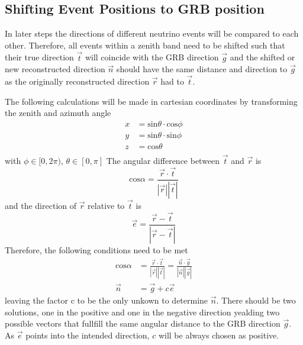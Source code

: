 \subsection{Shifting Event Positions to GRB position}
\label{sec:shift2source}
In later steps the directions of different neutrino events will be compared to
each other. Therefore, all events within a zenith band need to be shifted such
that their true
direction $\vec{t}$ will coincide with the GRB direction $\vec{g}$ and the
shifted or new reconstructed direction $\vec{n}$ should have the same distance
and direction
to $\vec{g}$ as the originally reconstructed direction $\vec{r}$ had to
$\vec{t}$.

The following calculations will be made in cartesian coordinates by
transforming the zenith and azimuth angle
\begin{equation}
 \begin{align}
  x &= \text{sin}\theta \cdot \text{cos} \phi \\
  y &= \text{sin}\theta \cdot \text{sin} \phi \\
  z &= \text{cos}\theta\\
 \end{align}
\end{equation}
with $\phi \in [0, 2 \pi)$, $\theta \in [0, \pi]$
The angular difference between $\vec{t}$ and $\vec{r}$ is
\begin{equation}
 \text{cos} \alpha = \frac{\vec{r} \cdot \vec{t}}{|\vec{r}| |\vec{t}|}
\end{equation}
and the direction of $\vec{r}$ relative to $\vec{t}$ is
\begin{equation}
 \vec{e} = \frac{\vec{r} - \vec{t}}{|\vec{r} - \vec{t}|}
\end{equation}
Therefore, the following conditions need to be met
\begin{align}
 \text{cos} \alpha &= \frac{\vec{r} \cdot \vec{t}}{|\vec{r}| |\vec{t}|} =
\frac{\vec{n} \cdot \vec{g}}{|\vec{n}| |\vec{g}|} \\
\vec{n} & = \vec{g} + c \vec{e}
\end{align}
leaving the factor c to be the only unkown to determine $\vec{n}$. There should
be two solutions, one in the positive and one in the negative direction
yealding two possible vectors that fullfill the same angular distance to the GRB
direction $\vec{g}$. As $\vec{e}$ points into the intended direction, $c$ will
be always chosen as positive.

